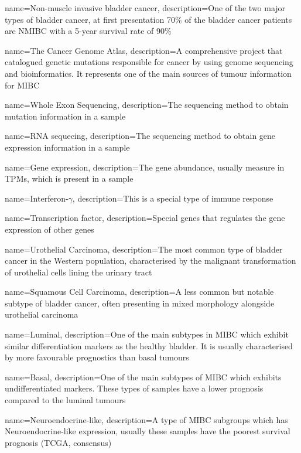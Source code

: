 {
    name=Non-muscle invasive bladder cancer,
    description={One of the two major types of bladder cancer, at first presentation 70\% of the bladder cancer patients are NMIBC with a 5-year survival rate of 90\%}
}

{
    name=The Cancer Genome Atlas,
    description={A comprehensive project that catalogued genetic mutations responsible for cancer by using genome sequencing and bioinformatics. It represents one of the main sources of tumour information for MIBC}
}

{
    name=Whole Exon Sequencing,
    description={The sequencing method to obtain mutation information in a sample}
}

{
    name=RNA sequecing,
    description={The sequencing method to obtain gene expression information in a sample}
}

{
    name=Gene expression,
    description={The gene abundance, usually measure in TPMs, which is present in a sample}
}

{
    name=Interferon-$\gamma$,
    description={This is a special type of immune response}
}

{
    name=Transcription factor,
    description={Special genes that regulates the gene expression of other genes}
}

{
    name=Urothelial Carcinoma,
    description={The most common type of bladder cancer in the Western population, characterised by the malignant transformation of urothelial cells lining the urinary tract}
}

{
    name=Squamous Cell Carcinoma,
    description={A less common but notable subtype of bladder cancer, often presenting in mixed morphology alongside urothelial carcinoma}
}


{
    name=Luminal,
    description={One of the main subtypes in MIBC which exhibit similar differentiation markers as the healthy bladder. It is usually characterised by more favourable prognostics than basal tumours}
}

{
    name=Basal,
    description={One of the main subtypes of MIBC which exhibits undifferentiated markers. These types of samples have a lower prognosis compared to the luminal tumours}
}



{
    name=Neuroendocrine-like,
    description={A type of MIBC subgroups which has Neuroendocrine-like expression, usually these samples have the poorest survival prognosis (TCGA, consensus)}
}

